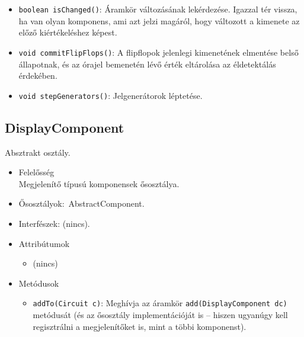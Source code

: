 \begin{itemize}
\begin{itemize}
	\item \texttt{boolean isChanged()}: Áramkör változásának lekérdezése. Igazzal tér vissza, ha van olyan komponens, ami azt jelzi magáról, hogy változott a kimenete az előző kiértékeléshez képest.
	\item \texttt{void commitFlipFlops()}: A flipflopok jelenlegi kimenetének elmentése belső állapotnak, és az órajel bemenetén lévő érték eltárolása az éldetektálás érdekében.
	\item \texttt{void stepGenerators()}: Jelgenerátorok léptetése.
\end{itemize}
\end{itemize}

\subsection{DisplayComponent}
Absztrakt osztály.
\begin{itemize}
\item Felelősség\\
Megjelenítő típusú komponensek ősosztálya.
\item Ősosztályok:\ AbstractComponent.
\item Interfészek: (nincs).
\item Attribútumok $\ $
\begin{itemize}
	\item (nincs)
\end{itemize}
\item Metódusok$\ $
\begin{itemize}
\item \texttt{addTo(Circuit c)}: Meghívja az áramkör \texttt{add(DisplayComponent dc)} metódusát (és az ősosztály implementációját is -- hiszen ugyanúgy kell regisztrálni a megjelenítőket is, mint a többi komponenst).
\end{itemize}
\end{itemize}

